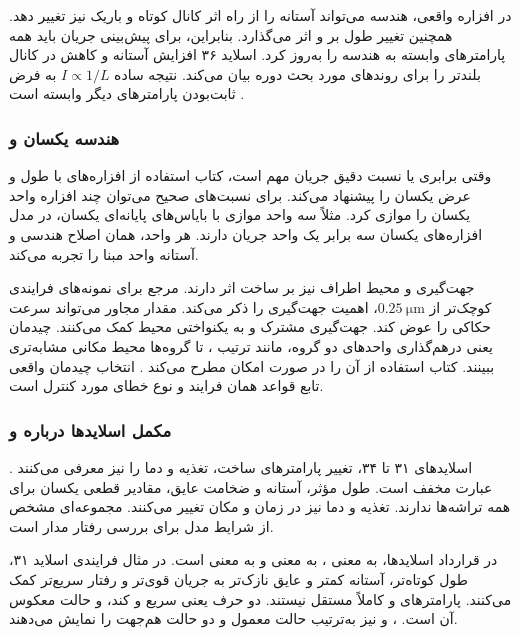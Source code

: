 در افزاره واقعی، هندسه می‌تواند آستانه را از راه اثر کانال کوتاه
و باریک نیز تغییر دهد. همچنین تغییر طول بر  و
 اثر می‌گذارد. بنابراین، برای پیش‌بینی
جریان باید همه پارامترهای وابسته به هندسه را به‌روز کرد.
اسلاید ۳۶ افزایش آستانه و کاهش  در کانال بلندتر را برای
روندهای مورد بحث دوره بیان می‌کند. نتیجه ساده \(I\propto1/L\)
به فرض ثابت‌بودن پارامترهای دیگر وابسته است
\cite[صفحه ۸۶]{weste}\cite[اسلاید ۳۶]{nonideal}.

\subsubsection*{هندسه یکسان و }
وقتی برابری یا نسبت دقیق جریان مهم است، کتاب استفاده از افزاره‌های
با طول و عرض یکسان را پیشنهاد می‌کند. برای نسبت‌های صحیح می‌توان
چند افزاره واحد یکسان را موازی کرد. مثلاً سه واحد موازی با بایاس‌های
پایانه‌ای یکسان، در مدل افزاره‌های یکسان سه برابر یک واحد جریان دارند.
هر واحد، همان اصلاح هندسی و آستانه واحد مبنا را تجربه می‌کند.

جهت‌گیری و محیط اطراف نیز بر ساخت اثر دارند. مرجع برای نمونه‌های
فرایندی کوچک‌تر از \(\qty{0.25}{\micro\metre}\)، اهمیت جهت‌گیری را
ذکر می‌کند. مقدار  مجاور می‌تواند سرعت حکاکی را
عوض کند. جهت‌گیری مشترک و  به یکنواختی محیط
کمک می‌کنند. چیدمان  یعنی درهم‌گذاری واحدهای
دو گروه، مانند ترتیب ، تا گروه‌ها محیط مکانی مشابه‌تری
ببینند. کتاب استفاده از آن را در صورت امکان مطرح می‌کند
\cite[صفحات ۸۶ و ۸۷]{weste}. انتخاب چیدمان واقعی تابع قواعد همان
فرایند و نوع خطای مورد کنترل است.

\subsubsection*{مکمل اسلایدها درباره  و }
\label{sec:pvt-supplement}
اسلایدهای ۳۱ تا ۳۴، تغییر پارامترهای ساخت، تغذیه و دما را نیز
معرفی می‌کنند \cite{nonideal}. عبارت  مخفف
 است. طول مؤثر، آستانه و ضخامت
عایق، مقادیر قطعی یکسان برای همه تراشه‌ها ندارند. تغذیه و دما نیز
در زمان و مکان تغییر می‌کنند.  مجموعه‌ای مشخص از شرایط
مدل برای بررسی رفتار مدار است.

در قرارداد اسلایدها،  به معنی ،  به معنی
 و  به معنی  است. در مثال فرایندی اسلاید
۳۱، طول کوتاه‌تر، آستانه کمتر و عایق نازک‌تر به جریان قوی‌تر و
رفتار سریع‌تر کمک می‌کنند. پارامترهای  و  کاملاً
مستقل نیستند. دو حرف  یعنی  سریع و  کند،
و  حالت معکوس آن است. ،  و  نیز
به‌ترتیب حالت معمول و دو حالت هم‌جهت را نمایش می‌دهند.

